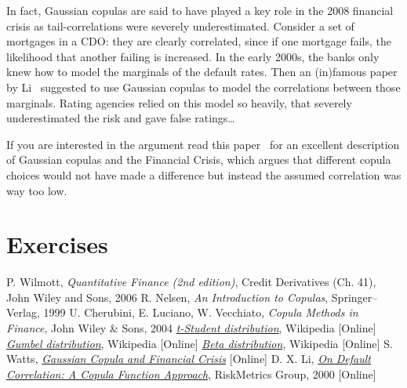 In fact, Gaussian copulas are said to have played a key role in the 2008 financial crisis as tail-correlations were severely underestimated. Consider a set of mortgages in a CDO: they are clearly correlated, since if one mortgage fails, the likelihood that another failing is increased. In the early 2000s, the banks only knew how to model the marginals of the default rates. Then an (in)famous paper by Li~\cite{bib:copula_li} suggested to use Gaussian copulas to model the correlations between those marginals. Rating agencies relied on this model so heavily, that severely underestimated the risk and gave false ratings\ldots

If you are interested in the argument read this paper~\cite{bib:copula_and_2008} for an excellent description of Gaussian copulas and the Financial Crisis, which argues that different copula choices would not have made a difference but instead the assumed correlation was way too low.

\section*{Exercises}


\begin{thebibliography}{9}
P. Wilmott, \emph{Quantitative Finance (2nd edition)}, Credit Derivatives (Ch. 41), John Wiley and Sons, 2006 
R. Nelsen, \emph{An Introduction to Copulas}, Springer–Verlag, 1999
U. Cherubini, E. Luciano, W. Vecchiato, \emph{Copula Methods in Finance}, John Wiley \& Sons, 2004
\href{https://en.wikipedia.org/wiki/Student\%27s\_t-distribution}{\emph{t-Student distribution}}, Wikipedia [Online]
\href{https://en.wikipedia.org/wiki/Gumbel_distribution}{\emph{Gumbel distribution}}, Wikipedia [Online]
\href{https://en.wikipedia.org/wiki/Beta_distribution}{\emph{Beta distribution}}, Wikipedia [Online]
 S. Watts, \href{http://samueldwatts.com/wp-content/uploads/2016/08/Watts-Gaussian-Copula_Financial_Crisis.pdf}{\emph{Gaussian Copula and Financial Crisis}} [Online]
D. X. Li, \href{http://www.maths.lth.se/matstat/kurser/fmsn15masm23/default.pdf}{\emph{On Default Correlation: A Copula Function Approach}}, RiskMetrics Group, 2000 [Online]
\end{thebibliography}

